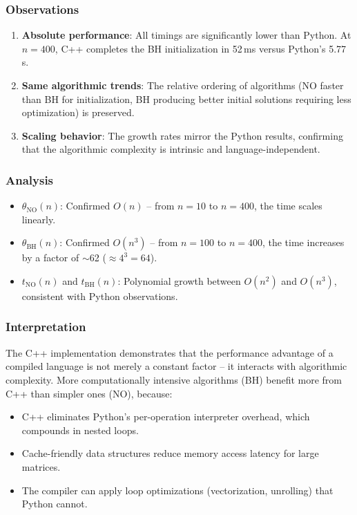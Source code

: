 \documentclass[12pt,a4paper]{article}
\begin{document}
\subsubsection{Observations}

\begin{enumerate}
  \item \textbf{Absolute performance}: All timings are significantly lower than Python. At $n=400$, C++ completes the BH initialization in 52\,ms versus Python's 5.77\,s.
  \item \textbf{Same algorithmic trends}: The relative ordering of algorithms (NO faster than BH for initialization, BH producing better initial solutions requiring less optimization) is preserved.
  \item \textbf{Scaling behavior}: The growth rates mirror the Python results, confirming that the algorithmic complexity is intrinsic and language-independent.
\end{enumerate}

\subsubsection{Analysis}

\begin{itemize}
  \item $\theta_{\text{NO}}(n)$: Confirmed $O(n)$ -- from $n=10$ to $n=400$, the time scales linearly.
  \item $\theta_{\text{BH}}(n)$: Confirmed $O(n^3)$ -- from $n=100$ to $n=400$, the time increases by a factor of $\sim$62 ($\approx 4^3 = 64$).
  \item $t_{\text{NO}}(n)$ and $t_{\text{BH}}(n)$: Polynomial growth between $O(n^2)$ and $O(n^3)$, consistent with Python observations.
\end{itemize}

\subsubsection{Interpretation}

The C++ implementation demonstrates that the performance advantage of a compiled language is not merely a constant factor -- it interacts with algorithmic complexity. More computationally intensive algorithms (BH) benefit more from C++ than simpler ones (NO), because:
\begin{itemize}
  \item C++ eliminates Python's per-operation interpreter overhead, which compounds in nested loops.
  \item Cache-friendly data structures reduce memory access latency for large matrices.
  \item The compiler can apply loop optimizations (vectorization, unrolling) that Python cannot.
\end{itemize}
\end{document}
